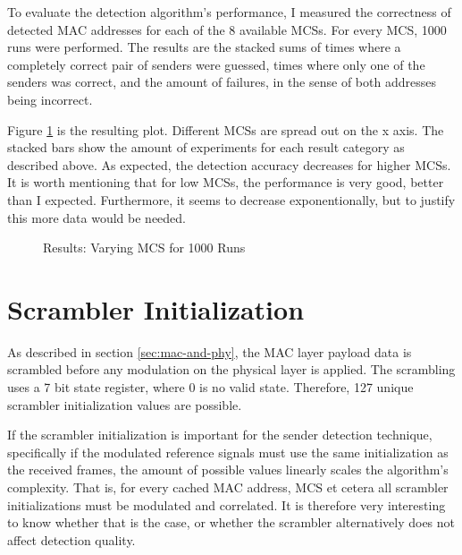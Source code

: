To evaluate the detection algorithm's performance, I measured the correctness of detected MAC addresses for each of the 8 available \glspl{MCS}. For every \gls{MCS}, 1000 runs were performed. The results are the stacked sums of times where a completely correct pair of senders were guessed, times where only one of the senders was correct, and the amount of failures, in the sense of both addresses being incorrect.

Figure \ref{fig:vary_mcs} is the resulting plot. Different \glspl{MCS} are spread out on the x axis. The stacked bars show the amount of experiments for each result category as described above. As expected, the detection accuracy decreases for higher \glspl{MCS}. It is worth mentioning that for low \glspl{MCS}, the performance is very good, better than I expected. Furthermore, it seems to decrease exponentionally, but to justify this more data would be needed.

\begin{figure}[H]
	\centering
	\setlength\figureheight{5cm}
	\setlength{}
	
	\caption{Results: Varying MCS for 1000 Runs}
	\label{fig:vary_mcs}
\end{figure}



\section{Scrambler Initialization}\label{sec:ex-scrambler}

As described in section \ref{sec:mac-and-phy}, the MAC layer payload data is scrambled before any modulation on the physical layer is applied. The scrambling uses a 7 bit state register, where 0 is no valid state. Therefore, 127 unique scrambler initialization values are possible.

If the scrambler initialization is important for the sender detection technique, specifically if the modulated reference signals must use the same initialization as the received frames, the amount of possible values linearly scales the algorithm's complexity. That is, for every cached MAC address, \gls{MCS} et cetera all scrambler initializations must be modulated and correlated. It is therefore very interesting to know whether that is the case, or whether the scrambler alternatively does not affect detection quality.\\


